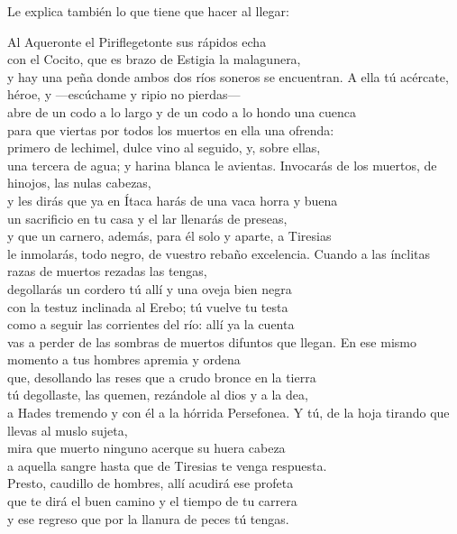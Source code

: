Le explica también lo que tiene que hacer al llegar:

\begin{versocita}
Al Aqueronte el Piriflegetonte sus rápidos echa\\
con el Cocito, que es brazo de Estigia la malagunera,\\
y hay una peña donde ambos dos ríos soneros se encuentran.
\stanzabreak
A ella tú acércate, héroe, y ---escúchame y ripio no pierdas---\\
abre de un codo a lo largo y de un codo a lo hondo una cuenca\\
para que viertas por todos los muertos en ella una ofrenda:\\
primero de lechimel, dulce vino al seguido, y, sobre ellas,\\
una tercera de agua; y harina blanca le avientas.
\stanzabreak
Invocarás de los muertos, de hinojos, las nulas cabezas,\\
y les dirás que ya en Ítaca harás de una vaca horra y buena\\
un sacrificio en tu casa y el lar llenarás de preseas,\\
y que un carnero, además, para él solo y aparte, a Tiresias\\
le inmolarás, todo negro, de vuestro rebaño excelencia.
\stanzabreak
Cuando a las ínclitas razas de muertos rezadas las tengas,\\
degollarás un cordero tú allí y una oveja bien negra\\
con la testuz inclinada al Erebo; tú vuelve tu testa\\
como a seguir las corrientes del río: allí ya la cuenta\\
vas a perder de las sombras de muertos difuntos que llegan.
\stanzabreak
En ese mismo momento a tus hombres apremia y ordena\\
que, desollando las reses que a crudo bronce en la tierra\\
tú degollaste, las quemen, rezándole al dios y a la dea,\\
a Hades tremendo y con él a la hórrida Persefonea.
\stanzabreak
Y tú, de la hoja tirando que llevas al muslo sujeta,\\
mira que muerto ninguno acerque su huera cabeza\\
a aquella sangre hasta que de Tiresias te venga respuesta.\\
Presto, caudillo de hombres, allí acudirá ese profeta\\
que te dirá el buen camino y el tiempo de tu carrera\\
y ese regreso que por la llanura de peces tú tengas.
\end{versocita}

